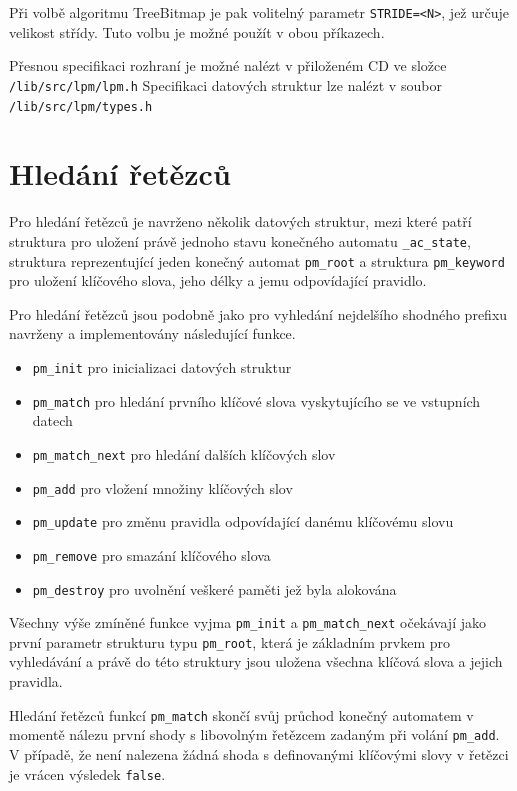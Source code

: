 Při volbě algoritmu TreeBitmap je pak volitelný parametr \texttt{STRIDE=<N>}, jež určuje velikost
střídy. Tuto volbu je možné použít v obou příkazech.

Přesnou specifikaci rozhraní je možné nalézt v přiloženém CD ve složce \texttt{/lib/src/lpm/lpm.h}
Specifikaci datových struktur lze nalézt v soubor \texttt{/lib/src/lpm/types.h}


\section{Hledání řetězců}\label{api:pm} %

Pro hledání řetězců je navrženo několik datových struktur, mezi které patří
struktura pro uložení právě jednoho stavu konečného automatu \texttt{\_ac\_state},
struktura reprezentující jeden konečný automat \texttt{pm\_root} a struktura \texttt{pm\_keyword}
pro uložení klíčového slova, jeho délky a jemu odpovídající pravidlo.


Pro hledání řetězců jsou podobně jako pro vyhledání nejdelšího shodného prefixu navrženy a implementovány
následující funkce.

\begin{itemize}
    \item{\texttt{pm\_init} pro inicializaci datových struktur}
    \item{\texttt{pm\_match} pro hledání prvního klíčové slova vyskytujícího se ve vstupních datech}
    \item{\texttt{pm\_match\_next} pro hledání dalších klíčových slov}
    \item{\texttt{pm\_add} pro vložení množiny klíčových slov}
    \item{\texttt{pm\_update} pro změnu pravidla odpovídající danému klíčovému slovu}
    \item{\texttt{pm\_remove} pro smazání klíčového slova}
    \item{\texttt{pm\_destroy} pro uvolnění veškeré paměti jež byla alokována}
\end{itemize}

Všechny výše zmíněné funkce vyjma \texttt{pm\_init} a \texttt{pm\_match\_next} očekávají jako první parametr strukturu typu \texttt{pm\_root},
která je základním prvkem pro vyhledávání a právě do této struktury
jsou uložena všechna klíčová slova a jejich pravidla.

Hledání řetězců funkcí \texttt{pm\_match} skončí svůj průchod konečný automatem v momentě nálezu první shody
s libovolným řetězcem zadaným při volání \texttt{pm\_add}.
V případě, že není nalezena žádná shoda
s definovanými klíčovými slovy v řetězci je vrácen výsledek \texttt{false}.

